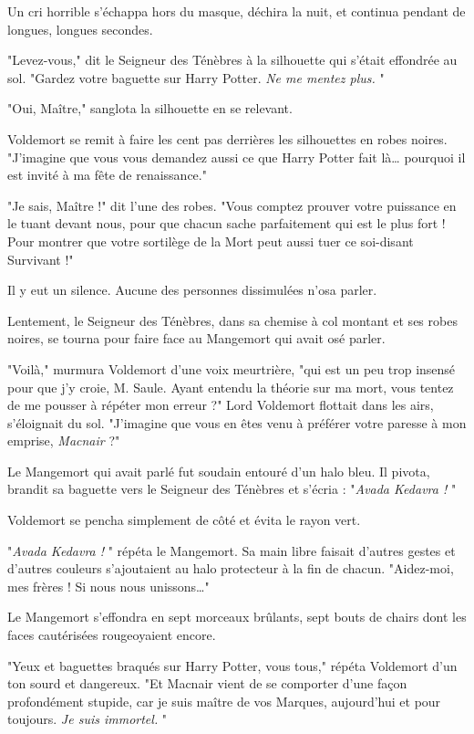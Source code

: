 Un cri horrible s'échappa hors du masque, déchira la nuit, et continua pendant de longues, longues secondes.

"Levez-vous," dit le Seigneur des Ténèbres à la silhouette qui s'était effondrée au sol. "Gardez votre baguette sur Harry Potter. \emph{Ne me mentez plus.} "

"Oui, Maître," sanglota la silhouette en se relevant.

Voldemort se remit à faire les cent pas derrières les silhouettes en robes noires. "J'imagine que vous vous demandez aussi ce que Harry Potter fait là… pourquoi il est invité à ma fête de renaissance."

"Je sais, Maître !" dit l'une des robes. "Vous comptez prouver votre puissance en le tuant devant nous, pour que chacun sache parfaitement qui est le plus fort ! Pour montrer que votre sortilège de la Mort peut aussi tuer ce soi-disant Survivant !"

Il y eut un silence. Aucune des personnes dissimulées n'osa parler.

Lentement, le Seigneur des Ténèbres, dans sa chemise à col montant et ses robes noires, se tourna pour faire face au Mangemort qui avait osé parler.

"Voilà," murmura Voldemort d'une voix meurtrière, "qui est un peu trop insensé pour que j'y croie, M. Saule. Ayant entendu la théorie sur ma mort, vous tentez de me pousser à répéter mon erreur ?" Lord Voldemort flottait dans les airs, s'éloignait du sol. "J'imagine que vous en êtes venu à préférer votre paresse à mon emprise, \emph{Macnair}  ?"

Le Mangemort qui avait parlé fut soudain entouré d'un halo bleu. Il pivota, brandit sa baguette vers le Seigneur des Ténèbres et s'écria : "\emph{Avada Kedavra !} "

Voldemort se pencha simplement de côté et évita le rayon vert.

"\emph{Avada Kedavra !} " répéta le Mangemort. Sa main libre faisait d'autres gestes et d'autres couleurs s'ajoutaient au halo protecteur à la fin de chacun. "Aidez-moi, mes frères ! Si nous nous unissons…"

Le Mangemort s'effondra en sept morceaux brûlants, sept bouts de chairs dont les faces cautérisées rougeoyaient encore.

"Yeux et baguettes braqués sur Harry Potter, vous tous," répéta Voldemort d'un ton sourd et dangereux. "Et Macnair vient de se comporter d'une façon profondément stupide, car je suis maître de vos Marques, aujourd'hui et pour toujours. \emph{Je suis immortel.} "

